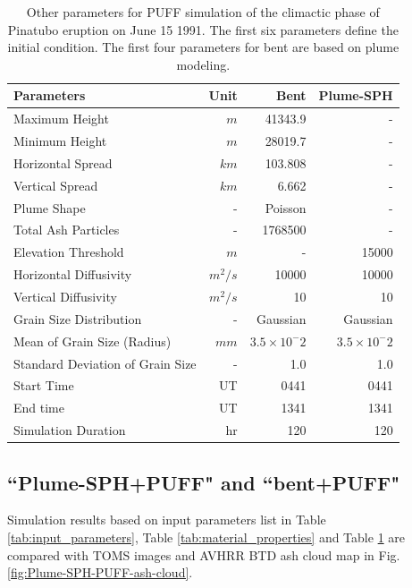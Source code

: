 \begin{table}[htp]
\centering
      \caption{Other parameters for PUFF simulation of the climactic phase of Pinatubo eruption on June 15 1991. The first six parameters define the initial condition. The first four parameters for bent are based on plume modeling.}	
	  \begin{tabular}{lrrr}
	    \hline
	    Parameters    & Unit & Bent & Plume-SPH \\
	    \hline
	    Maximum Height & $m$ & 41343.9 & - \\
	    Minimum Height & $m$ & 28019.7 & - \\
	    Horizontal Spread & $km$ & 103.808 & -\\
	    Vertical Spread & $km$ & 6.662  & - \\
	    Plume Shape & - & Poisson & - \\
	    Total Ash Particles  & - & 1768500 & - \\
	    Elevation Threshold & $m$ & - &  15000 \\
	    Horizontal Diffusivity & $m^2/s$ &10000 & 10000\\
	    Vertical Diffusivity & $m^2/s$ & 10 & 10 \\
	    Grain Size Distribution & - & Gaussian & Gaussian  \\
	    Mean of Grain Size (Radius) & $mm$ & $3.5 \times 10 ^-2$ & $3.5 \times 10 ^-2$ \\
	    Standard Deviation of Grain Size & - &  1.0 & 1.0 \\
	    	Start Time & UT & 0441 & 0441 \\
	    End time & UT & 1341 & 1341 \\
	    Simulation Duration & hr & 120 & 120 \\
	    \hline
	  \end{tabular}
	  \label{tab:input_parameter_PUFF_simulation}
\end{table}

\subsection{``Plume-SPH+PUFF" and ``bent+PUFF"}

Simulation results based on input parameters list in Table \ref{tab:input_parameters}, Table \ref{tab:material_properties} and Table \ref{tab:input_parameter_PUFF_simulation} are compared with TOMS images and AVHRR BTD ash cloud map in Fig. \ref{fig:Plume-SPH-PUFF-ash-cloud}.

